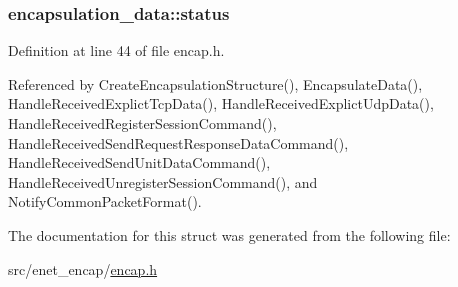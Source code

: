 \hypertarget{structencapsulation__data_ae9d36e698eb09d2248f8856da0281f5c}{
\subsubsection[{status}]{ {\bf encapsulation\-\_\-data\-::status}}}\label{d9/d42/structencapsulation__data_ae9d36e698eb09d2248f8856da0281f5c}


\-Definition at line 44 of file encap.\-h.



\-Referenced by \-Create\-Encapsulation\-Structure(), \-Encapsulate\-Data(), \-Handle\-Received\-Explict\-Tcp\-Data(), \-Handle\-Received\-Explict\-Udp\-Data(), \-Handle\-Received\-Register\-Session\-Command(), \-Handle\-Received\-Send\-Request\-Response\-Data\-Command(), \-Handle\-Received\-Send\-Unit\-Data\-Command(), \-Handle\-Received\-Unregister\-Session\-Command(), and \-Notify\-Common\-Packet\-Format().



\-The documentation for this struct was generated from the following file\-:\begin{DoxyCompactItemize}
\item 
src/enet\-\_\-encap/\hyperlink{encap_8h}{encap.\-h}\end{DoxyCompactItemize}
